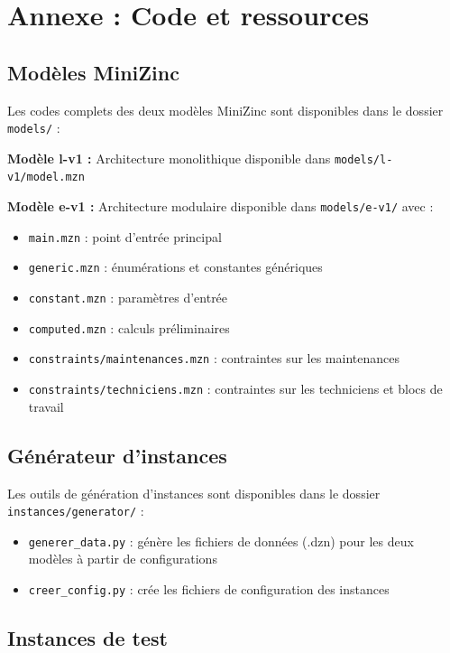 \section{Annexe : Code et ressources}

\subsection{Modèles MiniZinc}

Les codes complets des deux modèles MiniZinc sont disponibles dans le dossier \texttt{models/} :

\textbf{Modèle l-v1 :} Architecture monolithique disponible dans \texttt{models/l-v1/model.mzn}

\textbf{Modèle e-v1 :} Architecture modulaire disponible dans \texttt{models/e-v1/} avec :
\begin{itemize}
	\item \texttt{main.mzn} : point d'entrée principal
	\item \texttt{generic.mzn} : énumérations et constantes génériques
	\item \texttt{constant.mzn} : paramètres d'entrée
	\item \texttt{computed.mzn} : calculs préliminaires
	\item \texttt{constraints/maintenances.mzn} : contraintes sur les maintenances
	\item \texttt{constraints/techniciens.mzn} : contraintes sur les techniciens et blocs de travail
\end{itemize}

\subsection{Générateur d'instances}

Les outils de génération d'instances sont disponibles dans le dossier \texttt{instances/generator/} :
\begin{itemize}
	\item \texttt{generer\_data.py} : génère les fichiers de données (.dzn) pour les deux modèles à partir de configurations
	\item \texttt{creer\_config.py} : crée les fichiers de configuration des instances
\end{itemize}

\subsection{Instances de test}

